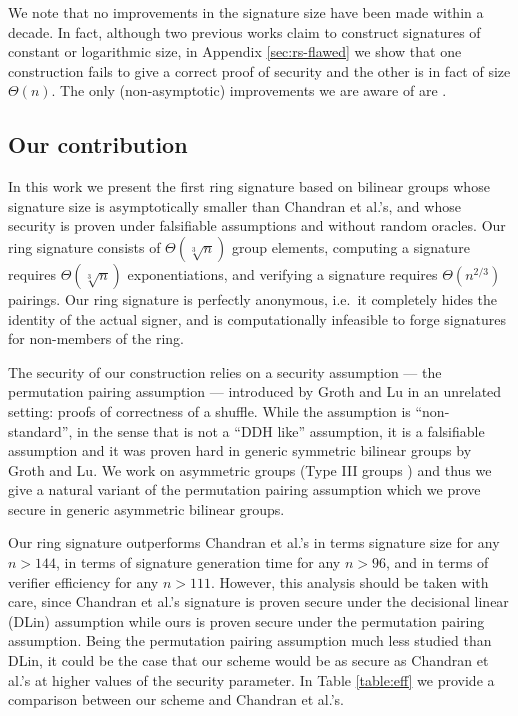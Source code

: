 We note that no improvements in the
signature size have been made within a decade. In fact, although two previous works claim to construct signatures of constant \cite{ACISP:BosDasRan15} or logarithmic \cite{IET:GriSusPla16} size, in Appendix \ref{sec:rs-flawed} we show that one construction fails to give a correct proof of security and the other is in fact of size $\Theta(n)$. The only (non-asymptotic) improvements we are aware of are \cite{TCC:Rafols15,AC:GonHevRaf15}.

\subsection{Our contribution}
In this work we present the first ring signature based on bilinear groups whose signature size is asymptotically smaller than Chandran et al.'s, and whose security is proven under falsifiable assumptions and without random oracles. Our ring signature consists of $\Theta(\sqrt[3]{n})$ group elements, computing a signature requires $\Theta(\sqrt[3]{n})$ exponentiations, and verifying a signature requires $\Theta(n^{2/3})$ pairings. Our ring signature is perfectly anonymous, i.e.~it completely hides the identity of the actual signer, and is computationally infeasible to forge signatures for non-members of the ring.

The security of our construction relies on a security assumption --- the {permutation pairing assumption} --- introduced by Groth and Lu \cite{AC:GroLu07} in an unrelated setting: proofs of correctness of a shuffle. While the assumption is ``non-standard'', in the sense that is not a ``DDH like'' assumption, it is a falsifiable assumption and it was proven hard in generic symmetric bilinear groups by Groth and Lu. We work on asymmetric groups (Type III groups \cite{EPRINT:GalPatSma06}) and thus we give a natural variant of the permutation pairing assumption which we prove secure in generic asymmetric bilinear groups.

Our ring signature outperforms Chandran et al.'s in terms signature size for any $n > 144$, in terms of signature generation time for any $n>96$, and in terms of verifier efficiency for any $n>111$. However, this analysis should be taken with care, since Chandran et al.'s signature is proven secure under the decisional linear (DLin) assumption while ours is proven secure under the permutation pairing assumption. Being the permutation pairing assumption much less studied than DLin, it could be the case that our scheme would be as secure as Chandran et al.'s at higher values of the security parameter. In Table \ref{table:eff} we provide a comparison between our scheme and Chandran et al.'s.
 

